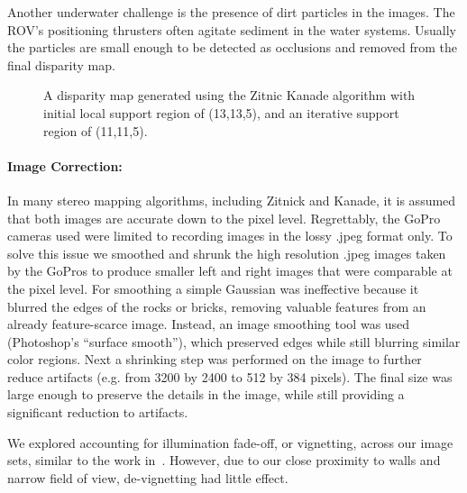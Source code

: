 \documentclass{llncs}
\begin{document}
Another underwater challenge is the presence of dirt particles in the images.
The ROV's positioning thrusters often agitate sediment in the water systems. Usually the particles are small enough to be detected as occlusions and removed from the final disparity map.
\begin{figure}[!h]
	\centering
		\quad %
		\quad
		\caption{A disparity map generated using the Zitnic Kanade algorithm with initial local support region of (13,13,5), and an iterative support region of (11,11,5).}
		\label{fig:disparity}
\end{figure}
%
\vspace{-25pt}
\paragraph{\textbf{Image Correction:}}
In many stereo mapping algorithms, including Zitnick and Kanade, it is assumed that both images are accurate down to the pixel level. Regrettably, the GoPro cameras used were limited to recording images in the lossy .jpeg format only. To solve this issue we smoothed and shrunk the high resolution .jpeg images taken by the GoPros to produce smaller left and right images that were comparable at the pixel level. For smoothing a simple Gaussian was ineffective because it blurred the edges of the rocks or bricks, removing valuable features from an already feature-scarce image. Instead, an image smoothing tool was used (Photoshop's ``surface smooth''), which preserved edges while still blurring similar color regions. Next a shrinking step was performed on the image to further reduce artifacts (e.g. from 3200 by 2400 to 512 by 384 pixels).
The final size was large enough to preserve the details in the image, while still providing a significant reduction to artifacts.

We explored accounting for illumination fade-off, or vignetting, across our image sets, similar to the work in~\cite{stereo:Roberson}. However, due to our close proximity to walls and narrow field of view, de-vignetting had little effect.
\end{document}
